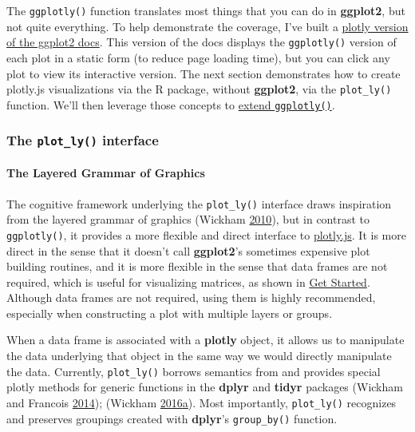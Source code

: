 \documentclass[12pt,]{isuthesis}
\let\oldparagraph\paragraph
\renewcommand{\paragraph}[1]{\oldparagraph{#1}\mbox{}}
\begin{document}
The \texttt{ggplotly()} function translates most things that you can do
in \textbf{ggplot2}, but not quite everything. To help demonstrate the
coverage, I've built a
\href{http://ropensci.github.io/plotly/ggplot2}{plotly version of the
ggplot2 docs}. This version of the docs displays the \texttt{ggplotly()}
version of each plot in a static form (to reduce page loading time), but
you can click any plot to view its interactive version. The next section
demonstrates how to create plotly.js visualizations via the R package,
without \textbf{ggplot2}, via the \texttt{plot\_ly()} function. We'll
then leverage those concepts to
\protect\hyperlink{extending-ggplotly}{extend \texttt{ggplotly()}}.

\subsubsection{\texorpdfstring{The \texttt{plot\_ly()}
interface}{The plot\_ly() interface}}\label{the-plot_ly-interface}

\hypertarget{the-layered-grammar-of-graphics}{\paragraph{The Layered
Grammar of Graphics}\label{the-layered-grammar-of-graphics}}

The cognitive framework underlying the \texttt{plot\_ly()} interface
draws inspiration from the layered grammar of graphics (Wickham
\protect\hyperlink{ref-ggplot2-paper}{2010}), but in contrast to
\texttt{ggplotly()}, it provides a more flexible and direct interface to
\href{https://github.com/plotly/plotly.js}{plotly.js}. It is more direct
in the sense that it doesn't call \textbf{ggplot2}'s sometimes expensive
plot building routines, and it is more flexible in the sense that data
frames are not required, which is useful for visualizing matrices, as
shown in \protect\hyperlink{get-started}{Get Started}. Although data
frames are not required, using them is highly recommended, especially
when constructing a plot with multiple layers or groups.

When a data frame is associated with a \textbf{plotly} object, it allows
us to manipulate the data underlying that object in the same way we
would directly manipulate the data. Currently, \texttt{plot\_ly()}
borrows semantics from and provides special plotly methods for generic
functions in the \textbf{dplyr} and \textbf{tidyr} packages (Wickham and
Francois \protect\hyperlink{ref-dplyr}{2014}); (Wickham
\protect\hyperlink{ref-tidyr}{2016}\protect\hyperlink{ref-tidyr}{a}).
Most importantly, \texttt{plot\_ly()} recognizes and preserves groupings
created with \textbf{dplyr}'s \texttt{group\_by()} function.
\end{document}
